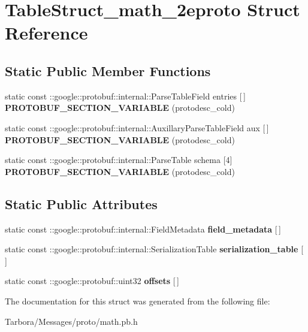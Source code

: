 \hypertarget{structTableStruct__math__2eproto}{}\section{Table\+Struct\+\_\+math\+\_\+2eproto Struct Reference}
\label{structTableStruct__math__2eproto}
\subsection*{Static Public Member Functions}
\begin{DoxyCompactItemize}
\item 
\mbox{\label{structTableStruct__math__2eproto_a26d9287c291430499a160a30846ae3e8}} 
static const \+::google\+::protobuf\+::internal\+::\+Parse\+Table\+Field entries \mbox{[}$\,$\mbox{]} {\bfseries P\+R\+O\+T\+O\+B\+U\+F\+\_\+\+S\+E\+C\+T\+I\+O\+N\+\_\+\+V\+A\+R\+I\+A\+B\+LE} (protodesc\+\_\+cold)
\item 
\mbox{\label{structTableStruct__math__2eproto_aec8124dbf912a90c8e341282dcf940e5}} 
static const \+::google\+::protobuf\+::internal\+::\+Auxillary\+Parse\+Table\+Field aux \mbox{[}$\,$\mbox{]} {\bfseries P\+R\+O\+T\+O\+B\+U\+F\+\_\+\+S\+E\+C\+T\+I\+O\+N\+\_\+\+V\+A\+R\+I\+A\+B\+LE} (protodesc\+\_\+cold)
\item 
\mbox{\label{structTableStruct__math__2eproto_ada3b0d25e7934b8000a3fa0bd188e7af}} 
static const \+::google\+::protobuf\+::internal\+::\+Parse\+Table schema \mbox{[}4\mbox{]} {\bfseries P\+R\+O\+T\+O\+B\+U\+F\+\_\+\+S\+E\+C\+T\+I\+O\+N\+\_\+\+V\+A\+R\+I\+A\+B\+LE} (protodesc\+\_\+cold)
\end{DoxyCompactItemize}
\subsection*{Static Public Attributes}
\begin{DoxyCompactItemize}
\item 
\mbox{\label{structTableStruct__math__2eproto_a833e470519b40ce26a50c48f0fe98f0b}} 
static const \+::google\+::protobuf\+::internal\+::\+Field\+Metadata {\bfseries field\+\_\+metadata} \mbox{[}$\,$\mbox{]}
\item 
\mbox{\label{structTableStruct__math__2eproto_a0e2d53b054d880d66bfb7c11cb0b1c64}} 
static const \+::google\+::protobuf\+::internal\+::\+Serialization\+Table {\bfseries serialization\+\_\+table} \mbox{[}$\,$\mbox{]}
\item 
\mbox{\label{structTableStruct__math__2eproto_af82218c177c051f3baf8930650b7413d}} 
static const \+::google\+::protobuf\+::uint32 {\bfseries offsets} \mbox{[}$\,$\mbox{]}
\end{DoxyCompactItemize}


The documentation for this struct was generated from the following file\+:\begin{DoxyCompactItemize}
\item 
Tarbora/\+Messages/proto/math.\+pb.\+h\end{DoxyCompactItemize}
